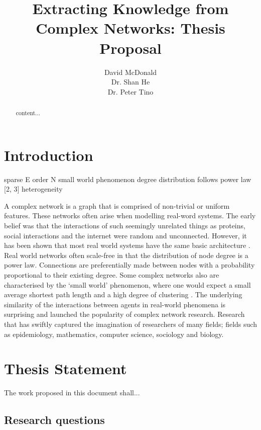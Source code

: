 \documentclass{report}
\title{\Huge \textbf{Extracting Knowledge from Complex Networks: Thesis Proposal}}
\author{David McDonald \\
	Dr. Shan He \\
	Dr. Peter Tino}
\date{}
\begin{document}
	
	\maketitle
	
	\begin{abstract}
		content...
	\end{abstract}
	
	\tableofcontents
	
	\chapter{Introduction}
	
	
		sparse E order N
		small world phenomenon
		degree distribution follows power law [2, 3]
		heterogeneity
		
		A complex network is a graph that is comprised of non-trivial or uniform features. These networks often arise when modelling real-word systems. The early belief was that the interactions of such seemingly unrelated things as proteins, social interactions and the internet were random and unconnected. However, it has been shown that most real world systems have the same basic architecture \cite{barabasi1999emergence,barabasi2009scale}. Real world networks often scale-free in that the distribution of node degree is a power law. Connections are preferentially made between nodes with a probability proportional to their existing degree. Some complex networks also are characterised by the `small world' phenomenon, where one would expect a small average shortest path length and a high degree of clustering \cite{watts1998collective}. The underlying similarity of the interactions between agents in real-world phenomena is surprising and launched the popularity of complex network research. Research that has swiftly captured the imagination of researchers of many fields; fields such as epidemiology, mathematics, computer science, sociology and biology.

	
	
	\chapter{Thesis Statement}
	
	The work proposed in this document shall...
	
	\section{Research questions}
	
\end{document}
